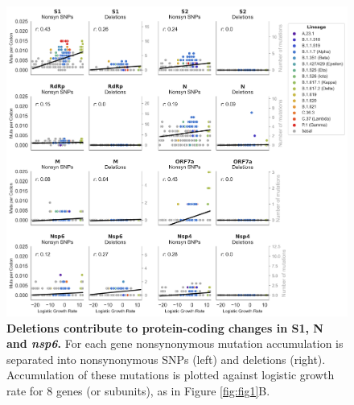 \documentclass[11pt,oneside,letterpaper]{article}
\begin{document}
\begin{figure}[h!]
	\centerline{\includegraphics[scale=0.5]{fig1_supp2.png}}
	\caption{\textbf{Deletions contribute to protein-coding changes in S1, N and \emph{nsp6}.}
	For each gene nonsynonymous mutation accumulation is separated into nonsynonymous SNPs (left) and deletions (right). Accumulation of these mutations is plotted against logistic growth rate for 8 genes (or subunits), as in Figure \ref{fig:fig1}B.
	}
	\label{fig:fig1_supp2}
\end{figure}
\end{document}
